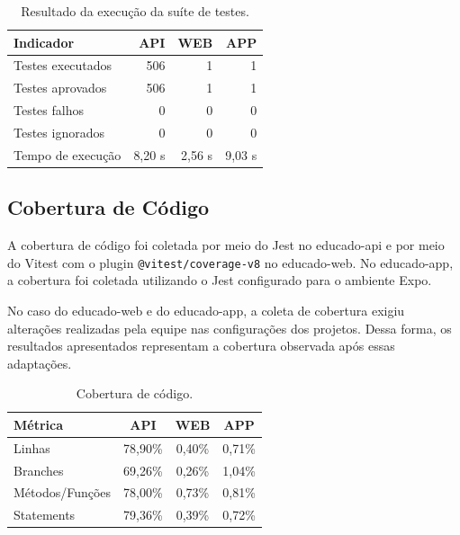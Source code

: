 \begin{table}[H]
\centering
\caption{Resultado da execução da suíte de testes.}
\label{tab:execucao}
\begin{tabular}{lrrr}
\toprule
\textbf{Indicador} & \textbf{API}  & \textbf{WEB} & \textbf{APP}\\
\midrule
Testes executados & 506 & 1 & 1 \\
Testes aprovados & 506 & 1 & 1 \\
Testes falhos & 0 & 0 & 0 \\
Testes ignorados & 0 & 0 & 0 \\
Tempo de execução & 8,20 s & 2,56 s & 9,03 s \\
\bottomrule
\end{tabular}
\end{table}



\subsection{Cobertura de Código}

A cobertura de código foi coletada por meio do Jest no educado-api 
e por meio do Vitest com o plugin \texttt{@vitest/coverage-v8} no educado-web.
No educado-app, a cobertura foi coletada utilizando o Jest configurado para o ambiente Expo.

No caso do educado-web e do educado-app, a coleta de cobertura exigiu alterações realizadas pela equipe nas configurações dos projetos.
Dessa forma, os resultados apresentados representam a cobertura observada após essas adaptações.

\begin{table}[H]
\centering
\caption{Cobertura de código.}
\label{tab:cobertura}
\begin{tabular}{lccc}
\toprule
\textbf{Métrica} & \textbf{API} & \textbf{WEB} & \textbf{APP} \\
\midrule
Linhas & 78,90\% & 0,40\%  & 0,71\% \\
Branches & 69,26\% & 0,26\% & 1,04\% \\
Métodos/Funções & 78,00\% & 0,73\% & 0,81\% \\
Statements & 79,36\% & 0,39\% & 0,72\% \\
\bottomrule
\end{tabular}
\end{table}

